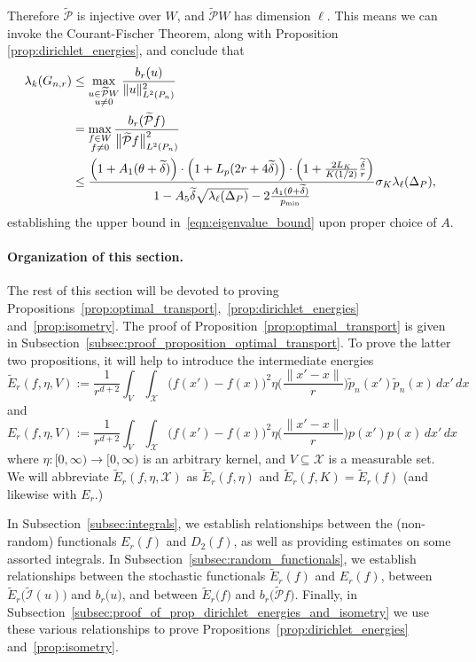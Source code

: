 \documentclass[twoside]{article}
\newcommand{\1}{\mathbf{1}}
\newcommand{\Xset}{\mathcal{X}}
\newcommand{\Leb}{L}
\newcommand{\mc}[1]{\mathcal{#1}}
\newcommand{\wt}[1]{\widetilde{#1}}
\theoremstyle{definition}
\theoremstyle{remark}
\begin{document}
Therefore $\wt{\mc{P}}$ is injective over $W$, and $\wt{\mc{P}}W$ has dimension $\ell$. This means we can invoke the Courant-Fischer Theorem, along with Proposition \ref{prop:dirichlet_energies}, and conclude that
\begin{align*}
\lambda_k(G_{n,r}) & \leq \max_{\substack{u \in \wt{\mc{P}}W \\ u \neq 0} } \frac{b_r(u)}{\|u\|_{\Leb^2(P_n)}^2} \\
& = \max_{\substack{f \in W \\ f \neq 0} } \frac{b_r(\wt{\mc{P}}f)}{\bigl\|\wt{\mc{P}}f\bigr\|_{\Leb^2(P_n)}^2} \\
& \leq \frac{\Bigl(1 + A_1(\theta + \wt{\delta})\Bigr) \cdot \Bigl(1 + L_p(2r + 4\wt{\delta})\Bigr) \cdot \Bigl(1 + \frac{2L_K}{K(1/2)}\frac{\wt{\delta}}{r}\Bigr)}{1 - A_5\wt{\delta} \sqrt{\lambda_{\ell}(\Delta_P)} - 2\frac{A_1(\theta + \wt{\delta})}{p_{\min}}} \sigma_K \lambda_{\ell}(\Delta_P),
\end{align*}
establishing the upper bound in~\eqref{eqn:eigenvalue_bound} upon proper choice of $A$.

\paragraph{Organization of this section.}
The rest of this section will be devoted to proving Propositions~\ref{prop:optimal_transport},~\ref{prop:dirichlet_energies} and~\ref{prop:isometry}. The proof of Proposition~\ref{prop:optimal_transport} is given in Subsection~\ref{subsec:proof_proposition_optimal_transport}. To prove the latter two propositions, it will help to introduce the intermediate energies
\begin{equation*}
\wt{E}_r(f,\eta,V) := \frac{1}{r^{d + 2}}\int_{V} \int_{\Xset} \bigl(f(x') - f(x)\bigr)^2 \eta\biggl(\frac{\|x' - x\|}{r}\biggr) \wt{p}_n(x') \wt{p}_n(x) \,dx' \,dx
\end{equation*}
and
\begin{equation*}
{E}_r(f,\eta,V) := \frac{1}{r^{d + 2}}\int_{V} \int_{\Xset} \bigl(f(x') - f(x)\bigr)^2 \eta\biggl(\frac{\|x' - x\|}{r}\biggr) p(x') p(x) \,dx' \,dx
\end{equation*}
where $\eta: [0,\infty) \to [0,\infty)$ is an arbitrary kernel, and $V \subseteq \Xset$ is a measurable set. We will abbreviate $\wt{E}_r(f,\eta,\Xset)$ as $\wt{E}_r(f,\eta)$ and $\wt{E}_r(f,K) = \wt{E}_r(f)$ (and likewise with $E_r$.)

In Subsection~\ref{subsec:integrals}, we establish relationships between the (non-random) functionals $E_r(f)$ and $D_2(f)$, as well as providing estimates on some assorted integrals. In Subsection~\ref{subsec:random_functionals}, we establish relationships between the stochastic functionals $\wt{E}_r(f)$ and $E_r(f)$,  between $\wt{E}_r\bigl(\wt{\mc{I}}(u)\bigr)$ and $b_r\bigl(u\bigr)$, and between $\wt{E}_r\bigl(f\bigr)$ and $b_r\bigl(\wt{\mc{P}}f\bigr)$. Finally, in Subsection~\ref{subsec:proof_of_prop_dirichlet_energies_and_isometry} we use these various relationships to prove Propositions~\ref{prop:dirichlet_energies} and~\ref{prop:isometry}.
\end{document}
